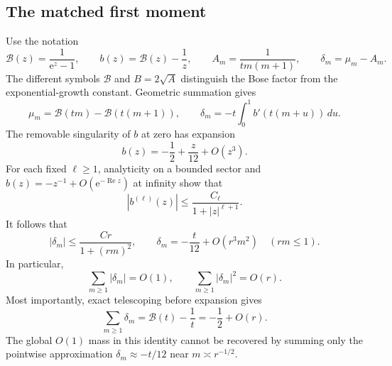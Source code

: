 \documentclass[11pt,letterpaper]{article}
\numberwithin{equation}{section}
\theoremstyle{definition}\newtheorem{definition}[theorem]{Definition}
\theoremstyle{remark}\newtheorem{remark}[theorem]{Remark}
\newcommand{\ee}{\mathrm e}
\DeclareMathOperator{\Rea}{Re}
\begin{document}
\subsection{The matched first moment}
Use the notation
\begin{equation}\label{dmv:cnt:eq:b}
\mathcal B(z)=\frac1{\ee^z-1},\qquad b(z)=\mathcal B(z)-\frac1z,\qquad
A_m=\frac1{tm(m+1)},\qquad \delta_m=\mu_m-A_m.
\end{equation}
The different symbols $\mathcal B$ and $B=2\sqrt A$ distinguish the Bose factor from the exponential-growth constant. Geometric summation gives
\begin{equation}\label{dmv:cnt:eq:mu}
\mu_m=\mathcal B(tm)-\mathcal B(t(m+1)),\qquad
\delta_m=-t\int_0^1b'(t(m+u))\,du.
\end{equation}
The removable singularity of $b$ at zero has expansion
\[
b(z)=-\frac12+\frac z{12}+O(z^3).
\]
For each fixed $\ell\ge1$, analyticity on a bounded sector and $b(z)=-z^{-1}+O(\ee^{-\Rea z})$ at infinity show that
\begin{equation}\label{dmv:cnt:eq:bderivative}
|b^{(\ell)}(z)|\le\frac{C_\ell}{1+|z|^{\ell+1}}.
\end{equation}
It follows that
\begin{equation}\label{dmv:cnt:eq:delta}
|\delta_m|\le\frac{Cr}{1+(rm)^2},\qquad
\delta_m=-\frac t{12}+O(r^3m^2)\quad(rm\le1).
\end{equation}
In particular,
\begin{equation}\label{dmv:cnt:eq:deltal1}
\sum_{m\ge1}|\delta_m|=O(1),\qquad
\sum_{m\ge1}|\delta_m|^2=O(r).
\end{equation}
Most importantly, exact telescoping before expansion gives
\begin{equation}\label{dmv:cnt:eq:deltatel}
\sum_{m\ge1}\delta_m=\mathcal B(t)-\frac1t=-\frac12+O(r).
\end{equation}
The global $O(1)$ mass in this identity cannot be recovered by summing only the pointwise approximation $\delta_m\approx-t/12$ near $m\asymp r^{-1/2}$.
\end{document}
